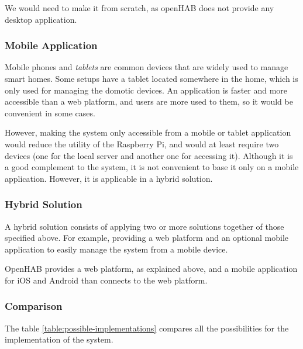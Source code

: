 We would need to make it from scratch, as openHAB does not provide any desktop application.

\subsubsection{Mobile Application}
Mobile phones and \textit{tablets} are common devices that are widely used to manage smart homes. Some setups have a tablet located
somewhere in the home, which is only used for managing the domotic devices. An application is faster and more accessible than a web
platform, and users are more used to them, so it would be convenient in some cases.

However, making the system only accessible from a mobile or tablet application would reduce the utility of the Raspberry Pi, and
would at least require two devices (one for the local server and another one for accessing it). Although it is a good complement to the
system, it is not convenient to base it only on a mobile application. However, it is applicable in a hybrid solution.

\subsubsection{Hybrid Solution}
A hybrid solution consists of applying two or more solutions together of those specified above. For example, providing a web platform
and an optional mobile application to easily manage the system from a mobile device.

OpenHAB provides a web platform, as explained above, and a mobile application for iOS and Android than connects to the web platform.

\subsubsection{Comparison}
The table \ref{table:possible-implementations} compares all the possibilities for the implementation of the system.

